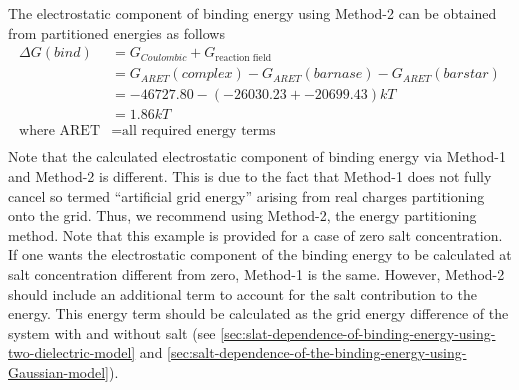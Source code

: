 \documentclass[9pt,tutorial,pubversion]{livecoms}
\begin{document}
The electrostatic component of binding energy using Method-2 can be obtained from partitioned energies as follows
\begin{equation}
\begin{aligned}
\Delta G(bind) &= G_{Coulombic} + G_{\text{reaction field}}\\
               &= G_{ARET}(complex) - G_{ARET}(barnase) - G_{ARET}(barstar) \\
               &= -46727.80 - (-26030.23 + -20699.43) kT \\
               &= 1.86 kT \\
\text{where ARET} &= \text{all required energy terms} \\
\end{aligned}
\end{equation}
Note that the calculated electrostatic component of binding energy via Method-1 and Method-2 is different. This is due to the fact that Method-1 does not fully cancel so termed ``artificial grid energy'' arising from real charges partitioning onto the grid. Thus, we recommend using Method-2, the energy partitioning method. Note that this example is provided for a case of zero salt concentration. If one wants the electrostatic component of the binding energy to be calculated at salt concentration different from zero, Method-1 is the same. However, Method-2 should include an additional term to account for the salt contribution to the energy. This energy term should be calculated as the grid energy difference of the system with and without salt (see \ref{sec:slat-dependence-of-binding-energy-using-two-dielectric-model} and \ref{sec:salt-dependence-of-the-binding-energy-using-Gaussian-model}).
\end{document}

